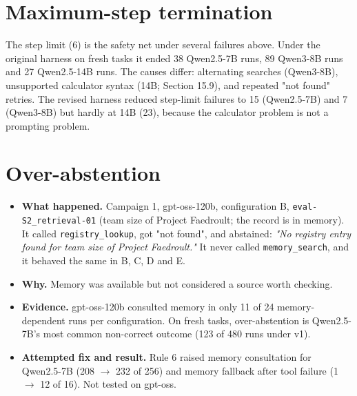 \documentclass[10.5pt,a4paper,oneside]{report}
\begin{document}
\section{Maximum-step termination}
The step limit (6) is the safety net under several failures above. Under the original harness on fresh tasks it ended 38 Qwen2.5-7B runs, 89 Qwen3-8B runs and 27 Qwen2.5-14B runs. The causes differ: alternating searches (Qwen3-8B), unsupported calculator syntax (14B; Section 15.9), and repeated "not found" retries. The revised harness reduced step-limit failures to 15 (Qwen2.5-7B) and 7 (Qwen3-8B) but hardly at 14B (23), because the calculator problem is not a prompting problem.

\section{Over-abstention}
\begin{itemize}
\item \textbf{What happened.} Campaign 1, gpt-oss-120b, configuration B, \texttt{eval-S2\_\allowbreak{}retrieval-01} (team size of Project Faedroult; the record is in memory). It called \texttt{registry\_\allowbreak{}lookup}, got "not found", and abstained: \emph{"No registry entry found for team size of Project Faedroult."} It never called \texttt{memory\_\allowbreak{}search}, and it behaved the same in B, C, D and E.
\item \textbf{Why.} Memory was available but not considered a source worth checking.
\item \textbf{Evidence.} gpt-oss-120b consulted memory in only 11 of 24 memory-dependent runs per configuration. On fresh tasks, over-abstention is Qwen2.5-7B's most common non-correct outcome (123 of 480 runs under v1).
\item \textbf{Attempted fix and result.} Rule 6 raised memory consultation for Qwen2.5-7B (208 $\rightarrow$ 232 of 256) and memory fallback after tool failure (1 $\rightarrow$ 12 of 16). Not tested on gpt-oss.
\end{itemize}
\end{document}
